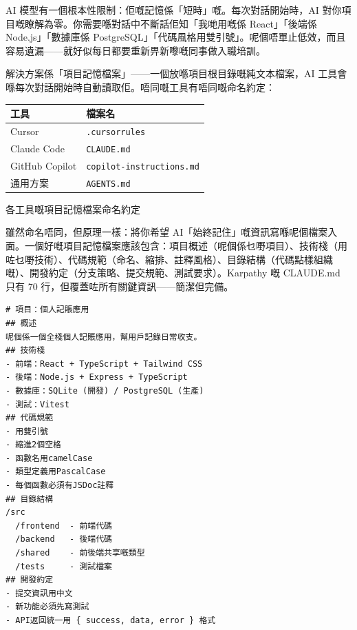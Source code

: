 


AI 模型有一個根本性限制：佢嘅記憶係「短時」嘅。每次對話開始時，AI 對你項目嘅瞭解為零。你需要喺對話中不斷話佢知「我哋用嘅係 React」「後端係 Node.js」「數據庫係 PostgreSQL」「代碼風格用雙引號」。呢個唔單止低效，而且容易遺漏——就好似每日都要重新畀新嚟嘅同事做入職培訓。

解決方案係「項目記憶檔案」——一個放喺項目根目錄嘅純文本檔案，AI 工具會喺每次對話開始時自動讀取佢。唔同嘅工具有唔同嘅命名約定：

\begin{center}
\begin{tabularx}{\linewidth}{|X|X|}
\hline
\textbf{工具} & \textbf{檔案名} \tabularnewline
\hline
Cursor & \texttt{.\allowbreak cursorrules} \tabularnewline
Claude Code & \texttt{CLAUDE.\allowbreak md} \tabularnewline
GitHub Copilot & \texttt{copilot-\allowbreak instructions.\allowbreak md} \tabularnewline
通用方案 & \texttt{AGENTS.\allowbreak md} \tabularnewline
\hline
\end{tabularx}
\end{center}

\begin{center}\small\color{gray}各工具嘅項目記憶檔案命名約定\end{center}

雖然命名唔同，但原理一樣：將你希望 AI「始終記住」嘅資訊寫喺呢個檔案入面。一個好嘅項目記憶檔案應該包含：項目概述（呢個係乜嘢項目）、技術棧（用咗乜嘢技術）、代碼規範（命名、縮排、註釋風格）、目錄結構（代碼點樣組織嘅）、開發約定（分支策略、提交規範、測試要求）。Karpathy 嘅 CLAUDE.md 只有 70 行，但覆蓋咗所有關鍵資訊——簡潔但完備。

\begin{lstlisting}
# 項目：個人記賬應用
## 概述
呢個係一個全棧個人記賬應用，幫用戶記錄日常收支。
## 技術棧
- 前端：React + TypeScript + Tailwind CSS
- 後端：Node.js + Express + TypeScript
- 數據庫：SQLite (開發) / PostgreSQL (生產)
- 測試：Vitest
## 代碼規範
- 用雙引號
- 縮進2個空格
- 函數名用camelCase
- 類型定義用PascalCase
- 每個函數必須有JSDoc註釋
## 目錄結構
/src
  /frontend  - 前端代碼
  /backend   - 後端代碼
  /shared    - 前後端共享嘅類型
  /tests     - 測試檔案
## 開發約定
- 提交資訊用中文
- 新功能必須先寫測試
- API返回統一用 { success, data, error } 格式
\end{lstlisting}

